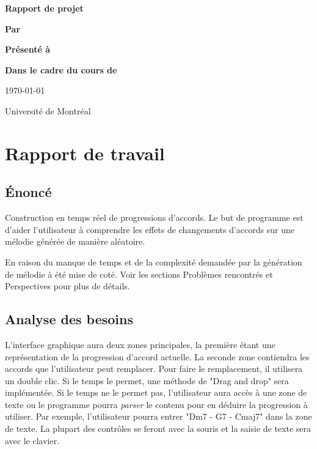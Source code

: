 \documentclass[letterpaper,12pt]{scrartcl}
\begin{document}
	\begin{center}
		\vspace{2cm}

		{\Huge\bf\sf Rapport de projet}
		\vspace{4cm}

		{\bf\sf Par}

		\vspace{0.5cm}{\large\bf\sf François Poitras}

		\vspace{2cm}

		{\bf\sf Présenté à}

		\vspace{0.5cm}{\large\bf\sf Olivier Bélanger}

		\vspace{2cm}

		{\bf\sf Dans le cadre du cours de}

		\vspace{0.5cm}{\large\bf\sf Création Musicale en Language Python 2 (MUS3327)}

		\vspace{\fill}
		
		\today

		\vspace{0.5cm}
		Université de Montréal
	\end{center}

	\newpage
	
	\section{Rapport de travail}
	\subsection{Énoncé}
	Construction en temps réel de progressions d'accords. Le but de programme est d'aider l'utilisateur à comprendre les effets de changements d'accords sur une mélodie générée de manière aléatoire.
	
	En raison du manque de temps et de la complexité demandée par la génération de mélodie à été mise de coté. Voir les sections Problèmes rencontrés et Perspectives pour plus de détails.
	
	\subsection{Analyse des besoins}
	
	L'interface graphique aura deux zones principales, la première étant une représentation de la progression d'accord actuelle. La seconde zone contiendra les accords que l'utilisateur peut remplacer. Pour faire le remplacement, il utilisera un double clic. Si le temps le permet, une méthode de "Drag and drop" sera implémentée. Si le temps ne le permet pas, l'utilisateur aura accès à une zone de texte ou le programme pourra \textit{parser} le contenu pour en déduire la progression à utiliser. Par exemple, l'utilisateur pourra entrer "Dm7 - G7 - Cmaj7" dans la zone de texte. La plupart des contrôles se feront avec la souris et la saisie de texte sera avec le clavier.
	
\end{document}

